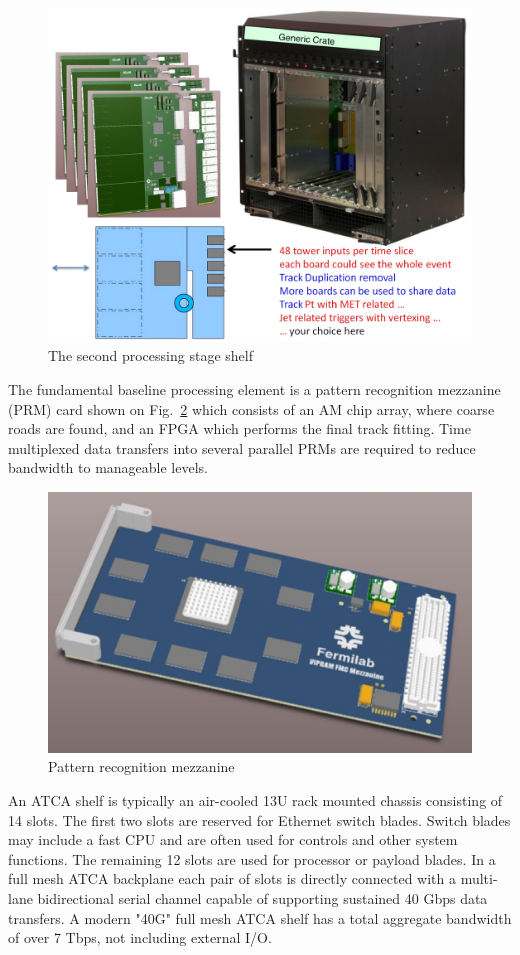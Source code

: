 \begin{figure}[ht!]
\centering
\includegraphics[width=0.7\columnwidth]{Plots/System_2.eps}
\caption{The second processing stage shelf}
\label{fig:System_2}
\end{figure}

\noindent The fundamental baseline processing element is a pattern recognition mezzanine (PRM) card shown on Fig.~\ref{fig:PRAM} which consists of an AM chip array, where coarse roads are found, and an FPGA which performs the final track fitting. Time multiplexed data transfers into several parallel PRMs are required to reduce bandwidth to manageable levels.

\begin{figure}[ht!]
\centering
\includegraphics[width=0.4\columnwidth]{Plots/PRAM.eps}
\caption{Pattern recognition mezzanine}
\label{fig:PRAM}
\end{figure}

\noindent An ATCA shelf is typically an air-cooled 13U rack mounted chassis consisting of 14 slots.  The first two slots are reserved for Ethernet switch blades.  Switch blades may include a fast CPU and are often used for controls and other system functions.  The remaining 12 slots are used for processor or payload blades.  In a full mesh ATCA backplane each pair of slots is directly connected with a multi-lane bidirectional serial channel capable of supporting sustained 40 Gbps data transfers.  A modern "40G" full mesh ATCA shelf has a total aggregate bandwidth of over 7 Tbps, not including external I/O.


